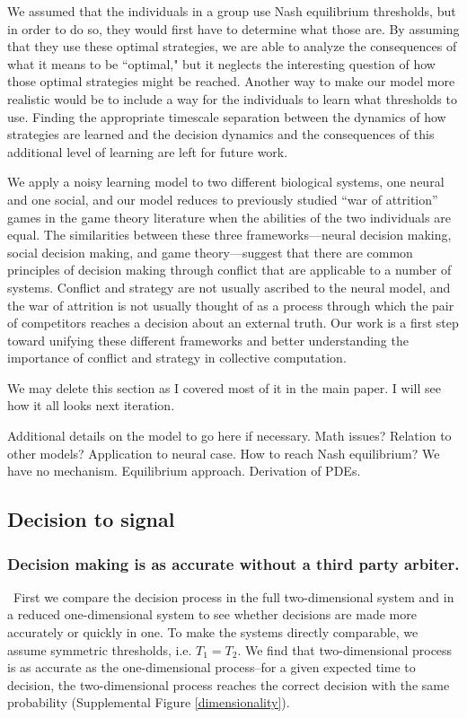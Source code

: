 \documentclass{pnastwo}
\begin{document}
\begin{article}
We assumed that the individuals in a group use Nash equilibrium thresholds, but in order to do so, they would first have to determine what those are.  By assuming that they use these optimal strategies, we are able to analyze the consequences of what it means to be ``optimal," but it neglects the interesting question of how those optimal strategies might be reached. Another way to make our model more realistic would be to include a way for the individuals to learn what thresholds to use. Finding the appropriate timescale separation between the dynamics of how strategies are learned and the decision dynamics and the consequences of this additional level of learning are left for future work.

We apply a noisy learning model to two different biological systems, one neural and one social, and our model reduces to previously studied ``war of attrition'' games in the game theory literature when the abilities of the two individuals are equal.  The similarities between these three frameworks---neural decision making, social decision making, and game theory---suggest that there are common principles of decision making through conflict that are applicable to a number of systems. Conflict and strategy are not usually ascribed to the neural model, and the war of attrition is not usually thought of as a process through which the pair of competitors reaches a decision about an external truth.  Our work is a first step toward unifying these different frameworks and better understanding the importance of conflict and strategy in collective computation.

 \label{empirical}
We may delete this section as I covered most of it in the main paper. I will see how it all looks next iteration.

\appendix[Model]
Additional details on the model to go here if necessary. Math issues? Relation to other models?  Application to neural case.  How to reach Nash equilibrium?  We have no mechanism.  Equilibrium approach. Derivation of PDEs.

\appendix[Results]

\subsection{Decision to signal}

\subsubsection{Decision making is as accurate without a third party arbiter. }
\label{onevstwoD}
\ First we compare the decision process in the full two-dimensional system and in a reduced one-dimensional system to see whether decisions are made more accurately or quickly in one. To make the systems directly comparable, we assume symmetric thresholds, i.e. $T_1=T_2$.  We find that two-dimensional process is as accurate as the one-dimensional process--for a given expected time to decision, the two-dimensional process reaches the correct decision with the same probability (Supplemental Figure \ref{dimensionality}). 



\end{article}
\end{document}
